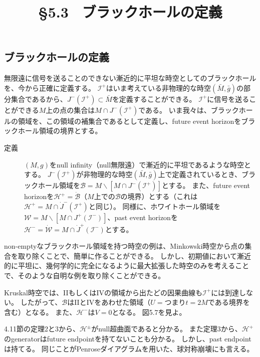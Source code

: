 \documentclass[a4paper, 12pt]{jsarticle}
\title{\S 5.3 \ ブラックホールの定義}
\begin{document}
\maketitle

\setcounter{section}{5}
\setcounter{subsection}{2}
\subsection{ブラックホールの定義}

無限遠に信号を送ることのできない漸近的に平坦な時空としてのブラックホールを、今から正確に定義する。
$\mathcal{I}^{+}$はいま考えている非物理的な時空$(\bar{M}, \bar{g})$の部分集合であるから、$J^{-} (\mathcal{I}^{+}) \subset \bar{M}$を定義することができる。
$\mathcal{I}^{+}$に信号を送ることができる$M$上の点の集合は$M \cap J^{-}(\mathcal{I}^{+})$である。
いま我々は、ブラックホールの領域を、この領域の補集合であるとして定義し、future event horizonをブラックホール領域の境界とする。

\begin{description}
	\item[定義] $(M, g)$をnull infinity（null無限遠）で漸近的に平坦であるような時空とする。
	$J^{-}(\mathcal{I}^{+})$が非物理的な時空$(\bar{M}, \bar{g})$上で定義されているとき、ブラックホール領域を$\mathcal{B}=M \backslash [M \cap J^{-}(\mathcal{I}^+)]$とする。
	また、future event horizonを$\mathcal{H}^+ = \dot{\mathcal{B}}$（$M$上での$\mathcal{B}$の境界）とする（これは$\mathcal{H}^+ = M \cap \dot{J}^-(\mathcal{I}^+)$と同じ）。
	同様に、ホワイトホール領域を$\mathcal{W} = M \backslash [M \cap J^+(\mathcal{I}^-)]$、past event horizonを$\mathcal{H}^- = \dot{\mathcal{W}} = M \cap \dot{J}^+(\mathcal{I}^-)$とする。
\end{description}

non-emptyなブラックホール領域を持つ時空の例は、Minkowski時空から点の集合を取り除くことで、簡単に作ることができる。
しかし、初期値において漸近的に平坦に、幾何学的に完全になるように最大拡張した時空のみを考えることで、そのような自明な例を取り除くことができる。

Kruskal時空では、IIもしくはIVの領域から出たどの因果曲線も$\mathcal{I}^+$には到達しない。
したがって、$\mathcal{B}$はIIとIVをあわせた領域（$U=$つまり$t=2M$である境界を含む）となる。
また、$\mathcal{H}^-$は$V=0$となる。
図5.7を見よ。

4.11節の定理2と3から、$\mathcal{H}^{\pm}$がnull超曲面であると分かる。
また定理3から、$\mathcal{H}^+$のgeneratorはfuture endpointを持てないことも分かる。
しかし、past endpointは持てる。
同じことがPenroseダイアグラムを用いた、球対称崩壊にも言える。
\end{document}
